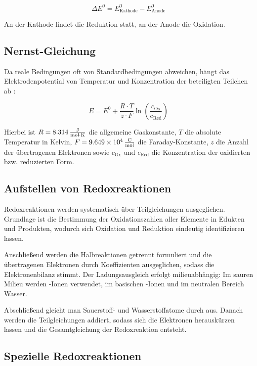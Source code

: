 \begin{equation}
    \Delta E^0 = E^0_{\text{Kathode}} - E^0_{\text{Anode}}
    \label{eq:zellspannung}
\end{equation}

An der Kathode findet die Reduktion statt, an der Anode die Oxidation.

\subsection{Nernst-Gleichung}

Da reale Bedingungen oft von Standardbedingungen abweichen, hängt das Elektrodenpotential von Temperatur und Konzentration der beteiligten Teilchen ab \cite{skript}:

\begin{equation}
    E = E^0 + \frac{R \cdot T}{z \cdot F}\ln \left(\frac{c_{\text{Ox}}}{c_{\text{Red}}}\right)
    \label{eq:nernst}
\end{equation}

Hierbei ist $R=\SI{8.314}{\frac{\joule}{\mole \cdot \kelvin}}$ die allgemeine Gaskonstante, $T$ die absolute Temperatur in Kelvin, $F=\SI{9.649e4}{\frac{\coulomb}{\mole}}$ die Faraday-Konstante, $z$ die Anzahl der übertragenen Elektronen sowie $c_{\text{Ox}}$ und $c_{\text{Red}}$ die Konzentration der oxidierten bzw. reduzierten Form. \cite{nist_constants}

\subsection{Aufstellen von Redoxreaktionen}
Redoxreaktionen werden systematisch über Teilgleichungen ausgeglichen. Grundlage ist die Bestimmung der Oxidationszahlen aller Elemente in Edukten und Produkten, wodurch sich Oxidation und Reduktion eindeutig identifizieren lassen.

Anschließend werden die Halbreaktionen getrennt formuliert und die übertragenen Elektronen durch Koeffizienten ausgeglichen, sodass die Elektronenbilanz stimmt. Der Ladungsausgleich erfolgt milieuabhängig: Im sauren Milieu werden -Ionen verwendet, im basischen -Ionen und im neutralen Bereich Wasser.

Abschließend gleicht man Sauerstoff- und Wasserstoffatome durch  aus. Danach werden die Teilgleichungen addiert, sodass sich die Elektronen herauskürzen lassen und die Gesamtgleichung der Redoxreaktion entsteht.\cite{skript}

\subsection{Spezielle Redoxreaktionen}


